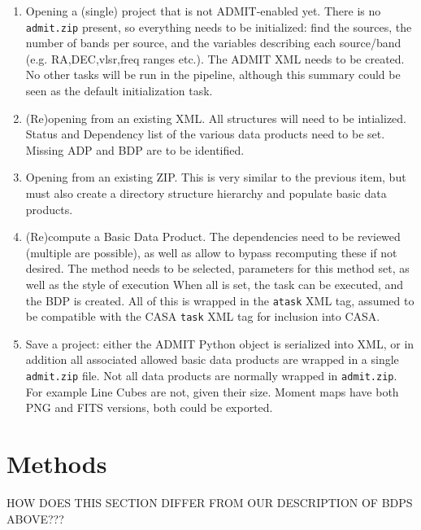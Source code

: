 \documentclass{article}
\begin{document}
\begin{enumerate}

\item
Opening a (single) project that is not ADMIT-enabled yet.  There is no
{\tt admit.zip} present, so everything needs to be initialized: find the
sources, the number of bands per source, and the variables describing
each source/band (e.g. RA,DEC,vlsr,freq ranges etc.). The ADMIT XML needs
to be created.  No other tasks will be run in the pipeline, although this
summary could be seen as the default initialization task.
%

\item
(Re)opening from an existing XML.  All structures will need to be 
intialized. Status and Dependency list of the various data products
need to be set. Missing ADP and BDP are to be identified.

\item
Opening from an existing ZIP. This is very similar to the previous
item, but must also create a directory structure hierarchy and 
populate basic data products.

\item
(Re)compute a Basic Data Product. The dependencies need to be reviewed
(multiple are possible), as well as allow to bypass recomputing these
if not desired.  The method needs to be selected, parameters for this
method set, as well as the style of execution When all is set, the task
can be executed, and the BDP is created. All of this is wrapped in the
{\tt atask} XML tag, assumed to be compatible with the CASA {\tt task}
XML tag for inclusion into CASA.

\item
Save a project:  either the ADMIT Python object is serialized into XML, 
or in addition all associated allowed basic data products 
are wrapped in a single {\tt admit.zip} file. Not all data products
are normally wrapped in {\tt admit.zip}. For example Line Cubes are not, given
their size. Moment maps have both PNG and FITS versions, both could be
exported.

\end{enumerate}

\section{Methods}

HOW DOES THIS SECTION DIFFER FROM OUR DESCRIPTION OF BDPS ABOVE???
\end{document}
